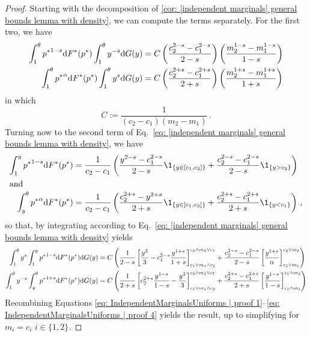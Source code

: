 \begin{proof}
    Starting with the decomposition of \cref{cor:  [independent marginals] general bounds lemma with density}, we can compute the terms separately. For the first two, we have
    \begin{align}
        \int_1^\theta {p^*}^{1-s}\mathrm{d} F^*(p^*)\int_1^\theta y^{-s}\mathrm{d}G(y)&= C\left(\frac{c_2^{2-s}-c_1^{2-s} }{2-s}\right)\left(\frac{m_2^{1-s}-m_1^{1-s} }{1-s}\right)\label{eq: IndependentMarginalsUniforms | proof 1}\\
        \int_1^\theta {p^*}^{
    \alpha}\mathrm{d} F^*(p^*)\int_1^\theta y^{s}\mathrm{d}G(y)&= C\left(\frac{c_2^{2+s}-c_1^{2+s}}{2+s}\right)\left(\frac{m_2^{1+s}-m_1^{1+s} }{1+s}\right)\label{eq: IndependentMarginalsUniforms | proof 2}
    \end{align}
    in which 
    \[
        C:=\frac1{(c_2-c_1)(m_2-m_1)}\,.
    \]
    Turning now to the second term of Eq.~\eqref{eq: [independent marginals] general bounds lemma with density}, we have 
    \begin{align}
        \int_\lb^\pred {\price}^{1-\smth}\de \dprice(\price) &=\frac{1}{c_2-c_1}\left(\frac{y^{2-\smth}-c_1^{2-\smth}}{2-\smth}\1_{\{\pred\in[c_1,c_2]\}} +\frac{c_2^{2-\smth}-c_1^{2-\smth}}{2-\smth}\1_{\{\pred>c_2\}}\right)
        \notag\\
        \intertext{and}
        \int_\pred^\ub{\price}^{\cstalpha}\de\dprice(\price)&= \frac{1}{c_2-c_1}\left( \frac{c_2^{2+\smth} - \pred^{2+\smth}}{2+\smth} \1_{\{\pred\in[c_1,c_2]\}} + \frac{c_2^{2+\smth}-c_1^{2+\smth}}{2+\smth}\1_{\{\pred<c_1\}}
        \right)\,,\notag
    \end{align}
so that, by integrating according to Eq.~\eqref{eq: [independent marginals] general bounds lemma with density} yields
\begin{align}
    \int_{1}^\theta y^{s}\int_1^y {p^*}^{1-s}\mathrm{d} F^*(p^*)\mathrm{d}G(y)&= C\left(\frac1{2-s}\left[\frac{y^3}3 - c_1^{2-s}\frac{y^{1+s}}{1+s} \right]_{c_1\vee m_1\wedge c_2}^{c_2\wedge m_2\vee c_1} + \frac{c_2^{2-s}-c_1^{2-s}}{2-s}\left[\frac{y^{1+s}}{\alpha}\right]^{c_2\vee m_2}_{c_2\vee m_1}\right)\label{eq: IndependentMarginalsUniforms | proof 3}
    \\
    \int_{1}^\theta y^{-s}\int_y^\theta{p^*}^{1+s}\mathrm{d}F^*(p^*)\mathrm{d}G(y) &= C\left(\frac1{2+s}\left[c_2^{2+s}\frac{y^{1-s}}{1-s}-\frac{y^3}{3}\right]_{c_1\vee m_1\wedge c_2}^{c_2\wedge m_2\vee c_1} + \frac{c_2^{2+s}-c_1^{2+s}}{2+s}\left[\frac{y^{1-s}}{1-s}\right]^{c_1\wedge m_2}_{c_1\wedge m_1} \right)\label{eq: IndependentMarginalsUniforms | proof 4}
\end{align}
    Recombining Equations \eqref{eq: IndependentMarginalsUniforms | proof 1}--\eqref{eq: IndependentMarginalsUniforms | proof 4} yields the result, up to simplifying for $m_i=c_i$ $i\in\{1,2\}$.
\end{proof}

